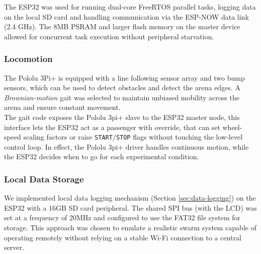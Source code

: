\documentclass[conference]{IEEEtran}
\begin{document}
The ESP32 was used for running dual-core FreeRTOS parallel tasks, logging data on the local SD card and handling communication via the ESP-NOW data link (2.4 GHz). The 8MB PSRAM and larger flash memory on the master device allowed for concurrent task execution without peripheral starvation.\\

\subsubsection{Locomotion}\label{sec:locomotion}

The Pololu 3Pi+ is equipped with a line following sensor array and two bump sensors, which can be used to detect obstacles and detect the arena edges. A \emph{Brownian-motion} gait was selected to maintain unbiased mobility across the arena and ensure constant movement.\\

The gait code exposes the Pololu 3pi+ slave to the ESP32 master node, this interface lets the ESP32 act as a passenger with override, that can set wheel-speed scaling factors or raise \texttt{START}/\texttt{STOP} flags without touching the low-level control loop. In effect, the Pololu 3pi+ driver handles continuous motion, while the ESP32 decides when to go for each experimental condition.\\

\subsubsection{Local Data Storage}
We implemented local data logging mechanism (Section \ref{sec:data-logging}) on the ESP32 with a 16GB SD card peripheral. The shared SPI bus (with the LCD) was set at a frequency of 20MHz and configured to use the FAT32 file system for storage. This approach was chosen to emulate a realistic swarm system capable of operating remotely without relying on a stable Wi-Fi connection to a central server.\\

\end{document}
